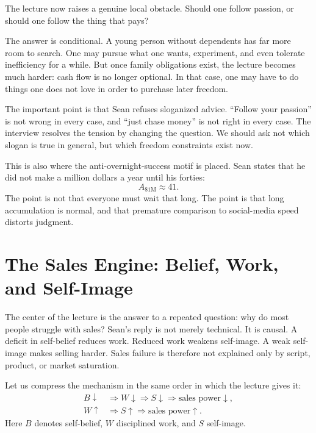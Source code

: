 The lecture now raises a genuine local obstacle. Should one follow passion, or should one follow the thing that pays?

The answer is conditional. A young person without dependents has far more room to search. One may pursue what one wants, experiment, and even tolerate inefficiency for a while. But once family obligations exist, the lecture becomes much harder: cash flow is no longer optional. In that case, one may have to do things one does not love in order to purchase later freedom.

The important point is that Sean refuses sloganized advice. ``Follow your passion'' is not wrong in every case, and ``just chase money'' is not right in every case. The interview resolves the tension by changing the question. We should ask not which slogan is true in general, but which freedom constraints exist now.

This is also where the anti-overnight-success motif is placed. Sean states that he did not make a million dollars a year until his forties:
\begin{equation}
A_{\$1\text{M}} \approx 41.
\end{equation}
The point is not that everyone must wait that long. The point is that long accumulation is normal, and that premature comparison to social-media speed distorts judgment.

\section{The Sales Engine: Belief, Work, and Self-Image}

The center of the lecture is the answer to a repeated question: why do most people struggle with sales? Sean's reply is not merely technical. It is causal. A deficit in self-belief reduces work. Reduced work weakens self-image. A weak self-image makes selling harder. Sales failure is therefore not explained only by script, product, or market saturation.

Let us compress the mechanism in the same order in which the lecture gives it:
\begin{align}
B \downarrow &\Longrightarrow W \downarrow \Longrightarrow S \downarrow \Longrightarrow \text{sales power} \downarrow,\\
W \uparrow &\Longrightarrow S \uparrow \Longrightarrow \text{sales power} \uparrow.
\end{align}
Here \(B\) denotes self-belief, \(W\) disciplined work, and \(S\) self-image.

